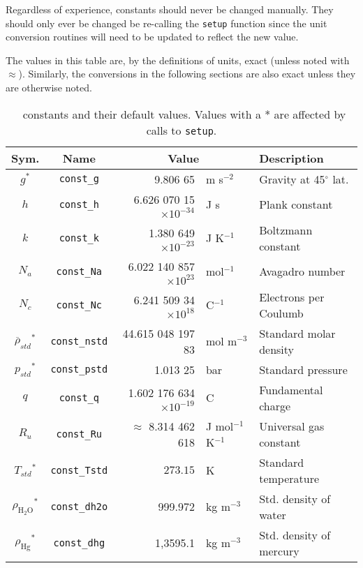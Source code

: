 Regardless of experience, constants should never be changed manually.  They should only ever be changed be re-calling the \verb|setup| function since the unit conversion routines will need to be updated to reflect the new value.

The values in this table are, by the definitions of units, exact (unless noted with $\approx$).  Similarly, the conversions in the following sections are also exact unless they are otherwise noted.

\begin{landscape}
\begin{table}[p]
\centering
\caption{\PM\ constants and their default values.  Values with a * are affected by calls to \texttt{setup}.}\label{tab:constants}
\small
\renewcommand{\arraystretch}{1.25}
\begin{tabular}{ccrll}
\hline
Sym. & Name & \multicolumn{2}{c}{Value} & Description \\
\hline
$g^*$ & \verb|const_g| & 9.806 65 & m s$^{-2}$ & Gravity at 45$^\circ$ lat.\\
$h$ & \verb|const_h| & 6.626 070 15$\times 10^{-34}$ & J s & Plank constant\\
$k$ & \verb|const_k| & 1.380 649 $\times 10^{-23}$ & J K$^{-1}$ & Boltzmann constant\\
$N_a$ & \verb|const_Na| & 6.022 140 857$\times 10^{23}$ & mol$^{-1}$ & Avagadro number\\
$N_c$ & \verb|const_Nc| & 6.241 509 34$\times 10^{18}$ & C$^{-1}$ & Electrons per Coulumb\\
$\overline{\rho}_{std}{^*}$ & \verb|const_nstd| & 44.615 048 197 83 & mol m$^{-3}$ & Standard molar density\\
$p_{std}{^*}$ & \verb|const_pstd| & 1.013 25 & bar & Standard pressure\\
$q$ & \verb|const_q| & 1.602 176 634 $\times 10^{-19}$ & C & Fundamental charge\\
$R_u$ & \verb|const_Ru| & $\approx$ 8.314 462 618 & J mol$^{-1}$ K$^{-1}$ & Universal gas constant\\
$T_{std}{^*}$ & \verb|const_Tstd| & $273.15$ & K & Standard temperature\\
$\rho_\mathrm{H_2O}{^*}$ & \verb|const_dh2o| & 999.972 & kg m$^{-3}$ & Std. density of water\\
$\rho_\mathrm{Hg}{^*}$ & \verb|const_dhg| & 1,3595.1 & kg m$^{-3}$ & Std. density of mercury\\
\hline
\end{tabular}
\renewcommand{\arraystretch}{1}
\end{table}
\end{landscape}

